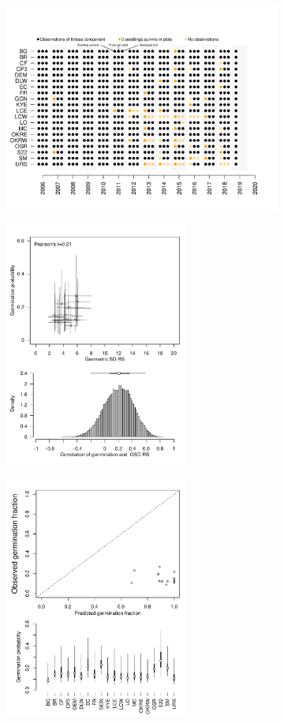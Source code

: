 \documentclass[varwidth=\maxdimen,border=0pt]{standalone}
\begin{document}
    

\begin{figure}

    \begin{subfigure}{6cm}
        \centering
       \includegraphics[width=\textwidth]{../../figures/analysis/zero-fitness.pdf}  
    \end{subfigure}%
    \begin{subfigure}{6cm}
        \centering
        \includegraphics[width=6cm]{../../figures/analysis/correlation-germ-rs.pdf} 
    \end{subfigure}
        \begin{subfigure}{6cm}
        \centering
        \includegraphics[width=6cm]{../../figures/analysis/obs-pred-germ.pdf} 
    \end{subfigure}
   \end{figure}
  
  
\end{document}
